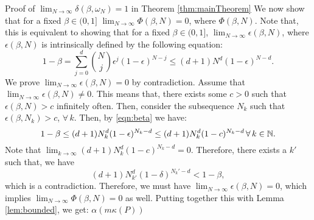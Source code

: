 \begin{subsection}{Proof of  $\lim_{N \to \infty}\delta(\beta, \omega_N) = 1$ in Theorem \ref{thm:mainTheorem}}
We now show that for a fixed $\beta \in (0,1]$ $\lim_{N \to \infty} \Phi(\beta, N) = 0$, where $\Phi(\beta, N)$. Note that, this is equivalent to showing that for a fixed $\beta \in (0, 1]$, $\lim_{N \to \infty}\epsilon(\beta, N)$, where $\epsilon(\beta, N)$ is intrinsically defined by the following equation:
\begin{equation}\label{eqn:beta}1-\beta = \sum_{j=0}^d {{N}\choose{j}} \epsilon^j (1-\epsilon)^{N-j} \leq  (d+1)N^d (1-\epsilon)^{N-d}.
\end{equation}
We prove $\lim_{N \to \infty} \epsilon(\beta, N) = 0$ by contradiction. Assume that $\lim_{N \to \infty} \epsilon(\beta, N) \not= 0$. This means that, there exists some $c > 0$ such that $\epsilon(\beta, N) > c$ infinitely often. Then, consider the subsequence $N_k$ such that $\epsilon(\beta, N_k) > c$, $\forall\, k.$ Then, by \eqref{eqn:beta} we have:
\begin{equation*}1-\beta\leq (d+1)N_k^d (1-\epsilon)^{N_k-d} \leq (d+1)N_k^d (1-c)^{N_k-d}\, \forall\,k \in \mathbb{N}. 
\end{equation*}
Note that $\lim_{k \to \infty}(d+1)N_k^d (1-c)^{N_k-d} = 0.$ Therefore, there exists a $k'$ such that, we have $$(d+1)N_{k'}^d (1-\delta)^{N_k'-d} < 1 - \beta,$$ which is a contradiction. Therefore, we must have  $\lim_{N \to \infty} \epsilon (\beta, N) = 0$, which implies $\lim_{N \to \infty} \Phi(\beta, N) = 0$ as well. Putting together this with Lemma \ref{lem:bounded}, we get:
$\alpha(m \kappa(P))$







\end{subsection}



